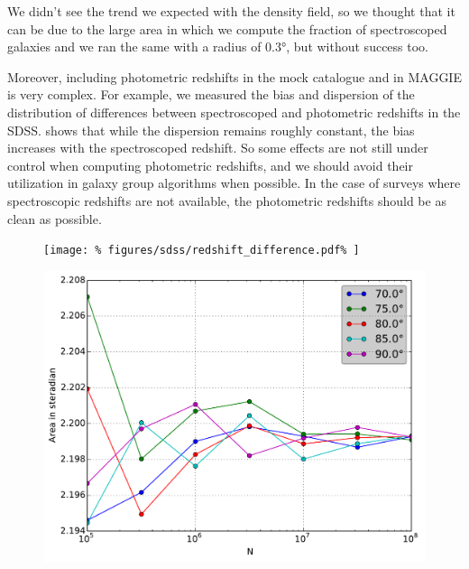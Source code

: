 %
We didn't see the trend we expected with the density field, so we thought that
it can be due to the large area in which we compute the fraction of
spectroscoped galaxies and we ran the same with a radius of 0.3°, but without
success too.

Moreover, including photometric redshifts in the mock catalogue and in MAGGIE
is very complex. For example, we measured the bias and dispersion of the
distribution of differences between spectroscoped and photometric redshifts in
the SDSS\@.  shows that while the dispersion
remains roughly constant, the bias increases with the spectroscoped redshift.
So some effects are not still under control when computing photometric
redshifts, and we should avoid their utilization in galaxy group algorithms
when possible. In the case of surveys where spectroscopic redshifts are not
available, the photometric redshifts should be as clean as possible.

\begin{figure}[hp]
    \begin{minipage}{\linewidth}
        \centering
        \texttt{[image: \%
            figures/sdss/redshift\_difference.pdf\%
        ]}
    \end{minipage}
    \begin{minipage}{\linewidth}
        \centering
        \includegraphics[height=0.4\textheight]{figures/sdss/SDSS_area}
    \end{minipage}
\end{figure}

